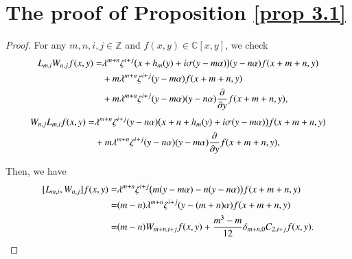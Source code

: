 \documentclass[12pt,reqno]{amsart}
\numberwithin{equation}{section}
\begin{document}
\section{The proof of Proposition \ref{prop 3.1}}\label{ Proposition 3.1}
\begin{proof}


    For any $m,n,i,j\in\mathbb{Z}$ and $f(x,y)\in\mathbb{C}[x,y]$, we check
\begin{equation*}
\aligned
L_{m,i}W_{n,j}f(x,y)
=&\lambda^{m+n}\zeta^{i+j}
\bigl(x+h_m(y)+i\sigma(y-m\alpha)\bigr)
(y-n\alpha)f(x+m+n,y)\\
&+m\lambda^{m+n}\zeta^{i+j}
(y-m\alpha)f(x+m+n,y)\\
&+m\lambda^{m+n}\zeta^{i+j}
(y-m\alpha)(y-n\alpha)
\frac{\partial }{\partial y}f(x+m+n,y),
\endaligned
\end{equation*}
\begin{equation*}
\aligned
W_{n,j}L_{m,i}f(x,y)
=&\lambda^{m+n}\zeta^{i+j}(y-n\alpha)
\bigl(x+n+h_m(y)+i\sigma(y-m\alpha)\bigr)
f(x+m+n,y)\\
&+m\lambda^{m+n}\zeta^{i+j}
(y-n\alpha)(y-m\alpha)
\frac{\partial }{\partial y}f(x+m+n,y),
\endaligned
\end{equation*}

Then, we have
\begin{equation*}
\aligned
\relax[L_{m,i},W_{n,j}]f(x,y)
=&\lambda^{m+n}\zeta^{i+j}
\bigl(m(y-m\alpha)-n(y-n\alpha)\bigr)f(x+m+n,y)\\
=&(m-n)\lambda^{m+n}\zeta^{i+j}
(y-(m+n)\alpha)f(x+m+n,y)\\
=&(m-n)W_{m+n,i+j}f(x,y)+\frac{m^3-m}{12}\delta_{m+n,0}C_{2,i+j}f(x,y).
\endaligned
\end{equation*}









\end{proof}
\end{document}
